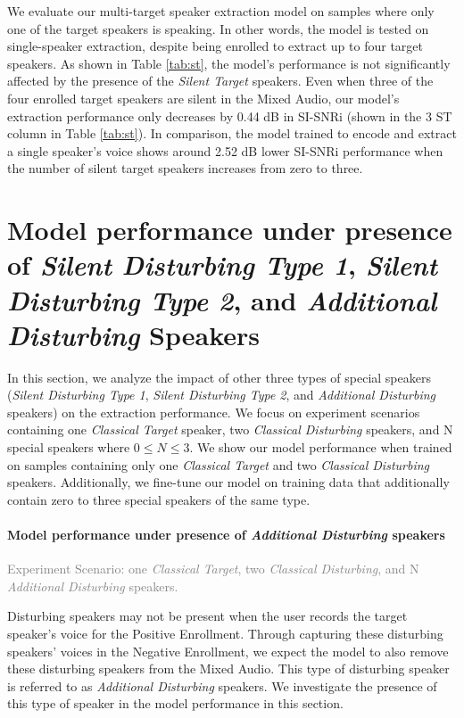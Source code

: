 We evaluate our multi-target speaker extraction model on samples where only one of the target speakers is speaking. In other words, the model is tested on single-speaker extraction, despite being enrolled to extract up to four target speakers. As shown in Table \ref{tab:st}, the model's performance is not significantly affected by the presence of the \textit{Silent Target} speakers. Even when three of the four enrolled target speakers are silent in the Mixed Audio, our model's extraction performance only decreases by 0.44 dB in SI-SNRi (shown in the 3 ST column in Table \ref{tab:st}). In comparison, the model trained to encode and extract a single speaker's voice shows around 2.52 dB lower SI-SNRi performance when the number of silent target speakers increases from zero to three. 


\section{Model performance under presence of \textit{Silent Disturbing Type 1}, \textit{Silent Disturbing Type 2}, and \textit{Additional Disturbing} Speakers} \label{app:special-spk}

In this section, we analyze the impact of other three types of special speakers (\textit{Silent Disturbing Type 1}, \textit{Silent Disturbing Type 2}, and \textit{Additional Disturbing} speakers) on the extraction performance. We focus on experiment scenarios containing one \textit{Classical Target} speaker, two \textit{Classical Disturbing} speakers, and N special speakers where $0 \leq N \leq 3$. We show our model performance when trained on samples containing only one \textit{Classical Target} and two \textit{Classical Disturbing} speakers. Additionally, we fine-tune our model on training data that additionally contain zero to three special speakers of the same type. 

\paragraph{Model performance under presence of \textit{Additional Disturbing} speakers}
\textcolor{gray}{Experiment Scenario: one \textit{Classical Target}, two \textit{Classical Disturbing}, and N \textit{Additional Disturbing} speakers.}

Disturbing speakers may not be present when the user records the target speaker's voice for the Positive Enrollment. Through capturing these disturbing speakers' voices in the Negative Enrollment, we expect the model to also remove these disturbing speakers from the Mixed Audio. This type of disturbing speaker is referred to as \textit{Additional Disturbing} speakers. We investigate the presence of this type of speaker in the model performance in this section. 

